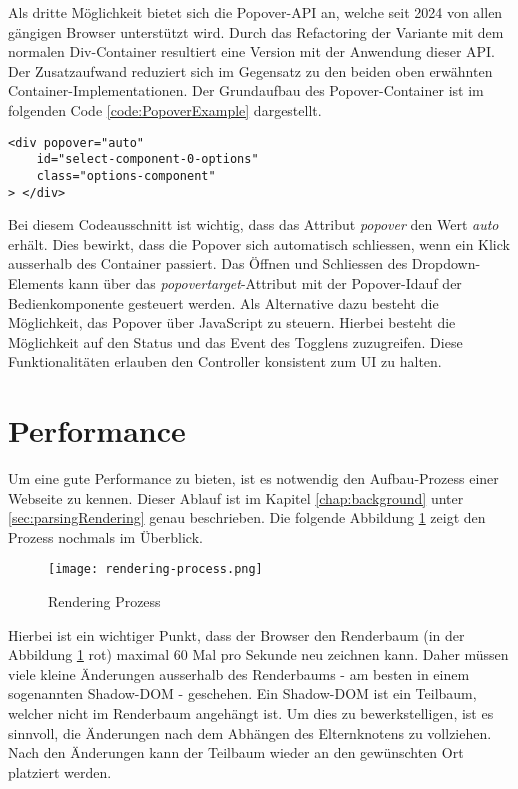 Als dritte Möglichkeit bietet sich die Popover-API an, welche seit 2024 von allen gängigen Browser unterstützt wird.
Durch das Refactoring der Variante mit dem normalen Div-Container resultiert eine Version mit der Anwendung dieser API.
Der Zusatzaufwand reduziert sich im Gegensatz zu den beiden oben erwähnten Container-Implementationen.
Der Grundaufbau des Popover-Container ist im folgenden Code \ref{code:PopoverExample} dargestellt.

\begin{lstlisting}[style = htmlcssjs, caption = Popover-Container Beispiel, label = code:PopoverExample]
<div popover="auto"
    id="select-component-0-options" 
    class="options-component" 
> </div>
\end{lstlisting}

Bei diesem Codeausschnitt ist wichtig, dass das Attribut \emph{popover} den Wert \emph{auto} erhält.
Dies bewirkt, dass die Popover sich automatisch schliessen, wenn ein Klick ausserhalb des Container passiert.
Das Öffnen und Schliessen des Dropdown-Elements kann über das \emph{popovertarget}-Attribut mit der Popover-Id\footnotemark auf der Bedienkomponente gesteuert werden.
Als Alternative dazu besteht die Möglichkeit, das Popover über JavaScript zu steuern.
Hierbei besteht die Möglichkeit auf den Status und das Event des Togglens zuzugreifen.
Diese Funktionalitäten erlauben den Controller konsistent zum UI zu halten.


\section{Performance}
\label{sec:performance}

Um eine gute Performance zu bieten, ist es notwendig den Aufbau-Prozess einer Webseite zu kennen.
Dieser Ablauf ist im Kapitel \ref{chap:background} unter \ref{sec:parsingRendering} genau beschrieben.
Die folgende Abbildung \ref{img:RenderingProcessRecap} zeigt den Prozess nochmals im Überblick.

\begin{figure}[!htb]
    \centering
    \texttt{[image: rendering-process.png]}
    \caption{Rendering Prozess}
    \label{img:RenderingProcessRecap}
\end{figure}

Hierbei ist ein wichtiger Punkt, dass der Browser den Renderbaum (in der Abbildung \ref{img:RenderingProcessRecap} rot) maximal 60 Mal pro Sekunde neu zeichnen kann.
Daher müssen viele kleine Änderungen ausserhalb des Renderbaums - am besten in einem sogenannten Shadow-DOM - geschehen.
Ein Shadow-DOM ist ein Teilbaum, welcher nicht im Renderbaum angehängt ist.
Um dies zu bewerkstelligen, ist es sinnvoll, die Änderungen nach dem Abhängen des Elternknotens zu vollziehen. 
Nach den Änderungen kann der Teilbaum wieder an den gewünschten Ort platziert werden.

